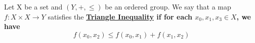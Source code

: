 \label{def:TriangleInequality}
\newcommand{\TriangleInequality}[0]{
    \bf \hyperref[def:TriangleInequality]{Triangle Inequality} \rm
}
\begin{df}
    
    Let X be a set and $(Y,+, \leq)$ be an ordered group.
    We say that a map $f:X \times X \to Y$ satisfies the \TriangleInequality if for each $x_0,x_1,x_3 \in X$, we have
    \begin{equation*}
        f(x_0,x_2) \leq  f(x_0,x_1)+f(x_1,x_2)
        \end{equation*}
\end{df} 